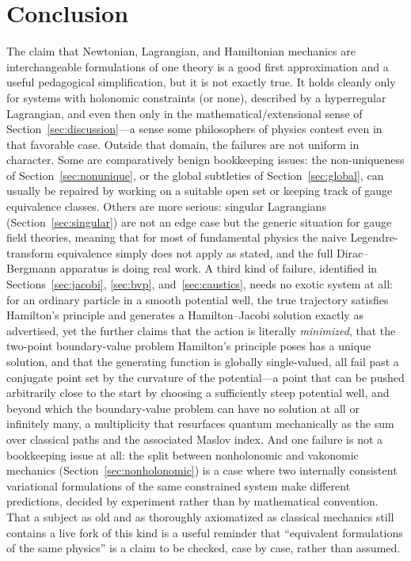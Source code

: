\documentclass[11pt]{article}
\begin{document}
\section{Conclusion}
\label{sec:conclusion}

The claim that Newtonian, Lagrangian, and Hamiltonian mechanics are interchangeable formulations of one theory is a good first approximation and a useful pedagogical simplification, but it is not exactly true. It holds cleanly only for systems with holonomic constraints (or none), described by a hyperregular Lagrangian, and even then only in the mathematical/extensional sense of Section~\ref{sec:discussion}---a sense some philosophers of physics contest even in that favorable case. Outside that domain, the failures are not uniform in character. Some are comparatively benign bookkeeping issues: the non-uniqueness of Section~\ref{sec:nonunique}, or the global subtleties of Section~\ref{sec:global}, can usually be repaired by working on a suitable open set or keeping track of gauge equivalence classes. Others are more serious: singular Lagrangians (Section~\ref{sec:singular}) are not an edge case but the generic situation for gauge field theories, meaning that for most of fundamental physics the naive Legendre-transform equivalence simply does not apply as stated, and the full Dirac--Bergmann apparatus is doing real work. A third kind of failure, identified in Sections~\ref{sec:jacobi}, \ref{sec:bvp}, and~\ref{sec:caustics}, needs no exotic system at all: for an ordinary particle in a smooth potential well, the true trajectory satisfies Hamilton's principle and generates a Hamilton--Jacobi solution exactly as advertised, yet the further claims that the action is literally \emph{minimized}, that the two-point boundary-value problem Hamilton's principle poses has a unique solution, and that the generating function is globally single-valued, all fail past a conjugate point set by the curvature of the potential---a point that can be pushed arbitrarily close to the start by choosing a sufficiently steep potential well, and beyond which the boundary-value problem can have no solution at all or infinitely many, a multiplicity that resurfaces quantum mechanically as the sum over classical paths and the associated Maslov index. And one failure is not a bookkeeping issue at all: the split between nonholonomic and vakonomic mechanics (Section~\ref{sec:nonholonomic}) is a case where two internally consistent variational formulations of the same constrained system make different predictions, decided by experiment rather than by mathematical convention. That a subject as old and as thoroughly axiomatized as classical mechanics still contains a live fork of this kind is a useful reminder that ``equivalent formulations of the same physics'' is a claim to be checked, case by case, rather than assumed.
\end{document}
